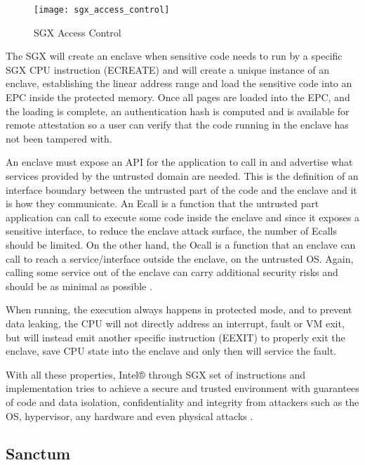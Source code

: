 \begin{figure}[htbp]
	\centering
	{\texttt{[image: sgx\_access\_control]}}%
	\caption{\gls{SGX} Access Control \cite{sgx:4}}
	\label{fig:sgx_access_control}
\end{figure}

The \gls{SGX} will create an enclave when sensitive code needs to run by a specific \gls{SGX} CPU instruction (ECREATE) and will create a unique instance of an enclave, establishing the linear address range and load the sensitive code into an \gls{EPC} inside the protected memory. Once all pages are loaded into the EPC, and the loading is complete, an authentication hash is computed and is available for remote attestation so a user can verify that the code running in the enclave has not been tampered with.

An enclave must expose an \gls{API} for the application to call in and advertise what services provided by the untrusted domain are needed. This is the definition of an interface boundary between the untrusted part of the code and the enclave and it is how they communicate. An \gls{Ecall} is a function that the untrusted part application can call to execute some code inside the enclave and since it exposes a sensitive interface, to reduce the enclave attack surface, the number of \glspl{Ecall} should be limited. On the other hand, the \gls{Ocall} is a function that an enclave can call to reach a service/interface outside the enclave, on the untrusted \gls{OS}. Again, calling some service out of the enclave can carry additional security risks and should be as minimal as possible \cite{sgx:6}.

When running, the execution always happens in protected mode, and to prevent data leaking, the CPU will not directly address an interrupt, fault or VM exit, but will instead emit another specific instruction (EEXIT) to properly exit the enclave, save CPU state into the enclave and only then will service the fault.

With all these properties, Intel® through \gls{SGX} set of instructions and implementation tries to achieve a secure and trusted environment with guarantees of code and data isolation, confidentiality and integrity from attackers such as the \gls{OS}, hypervisor, any hardware and even physical attacks \cite{cryptoeprint:2016:086}.

\subsection{Sanctum} %
\label{ssec:sanctum}

